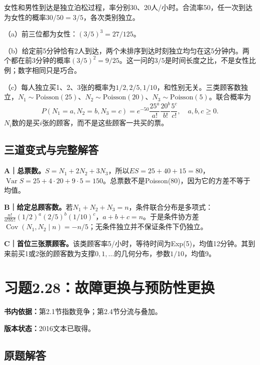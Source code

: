 \documentclass[
  11pt,
  a4paper,
  UTF8,fontset=fandol]{ctexart}
\let\OldSection\section
\renewcommand{\section}{\Needspace{7\baselineskip}\OldSection}
\let\OldSubsection\subsection
\renewcommand{\subsection}{\Needspace{5\baselineskip}\OldSubsection}
\begin{document}
女性和男性到达是独立泊松过程，率分别30、20人/小时。合流率50，任一次到达为女性的概率\(30/50=3/5\)，各次类别独立。

（a）前三位都为女性：\(\boxed{(3/5)^3=27/125}\)。

（b）给定前5分钟恰有2人到达，两个未排序到达时刻独立均匀在这5分钟内。两个都在前3分钟的概率\(\boxed{(3/5)^2=9/25}\)。这一问的\(3/5\)是时间长度之比，不是女性比例；数字相同只是巧合。

（c）每人独立买1、2、3张的概率为\(1/2,2/5,1/10\)，和性别无关。三类顾客数独立，\(N_1\sim\mathrm{Poisson}(25)\)、\(N_2\sim\mathrm{Poisson}(20)\)、\(N_3\sim\mathrm{Poisson}(5)\)。联合概率为
\[\boxed{P(N_1=a,N_2=b,N_3=c)=e^{-50}\frac{25^a}{a!}\frac{20^b}{b!}\frac{5^c}{c!}},\quad a,b,c\ge0.\]
\(N_i\)数的是买\(i\)张的顾客，而不是这些顾客一共买的票。

\subsection{三道变式与完整解答}\label{ux4e09ux9053ux53d8ux5f0fux4e0eux5b8cux6574ux89e3ux7b54-26}

\textbf{A｜总票数。}\(S=N_1+2N_2+3N_3\)，所以\(ES=25+40+15=80\)，\(\operatorname{Var}S=25+4\cdot20+9\cdot5=150\)。总票数不是Poisson(80)，因为它的方差不等于均值。

\textbf{B｜给定总顾客数。}若\(N_1+N_2+N_3=n\)，条件联合分布是多项式：\(\frac{n!}{a!b!c!}(1/2)^a(2/5)^b(1/10)^c\)，\(a+b+c=n\)。于是条件协方差\(\operatorname{Cov}(N_1,N_2\mid n)=-n/5\)；无条件独立并不保证条件下仍独立。

\textbf{C｜首位三张票顾客。}该类顾客率5/小时，等待时间为Exp(5)，均值12分钟。其到来前买1或2张的顾客数为支撑\(0,1,\ldots\)的几何分布，参数\(1/10\)，均值9。

\newpage

\section{习题2.28：故障更换与预防性更换}\label{ux4e60ux98982.28ux6545ux969cux66f4ux6362ux4e0eux9884ux9632ux6027ux66f4ux6362}

\textbf{书内依据：}第2.1节指数竞争；第2.4节分流与叠加。

\textbf{版本状态：}2016文本已取得。

\subsection{原题解答}\label{ux539fux9898ux89e3ux7b54-27}
\end{document}
